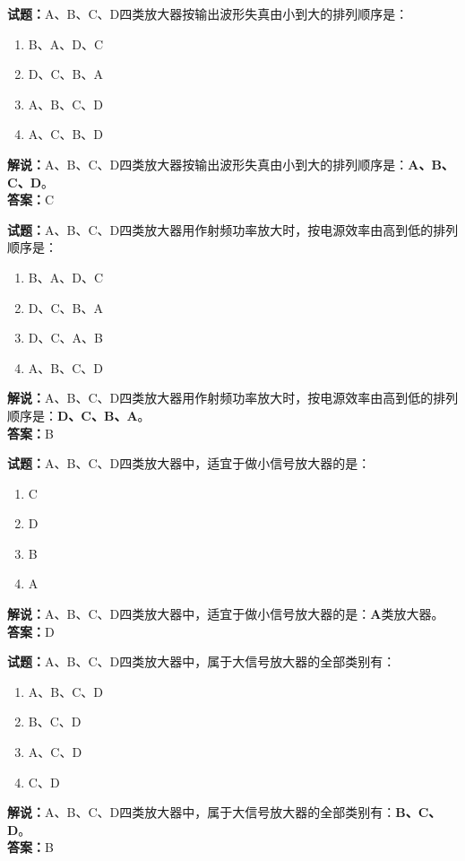 \documentclass{ctexbook}
\begin{document}
\vspace{1em}

\textbf{试题：}A、B、C、D四类放大器按输出波形失真由小到大的排列顺序是：
\begin{enumerate}[leftmargin=3em]
  \item B、A、D、C
  \item D、C、B、A
  \item A、B、C、D
  \item A、C、B、D
\end{enumerate}
\noindent\textbf{解说：}A、B、C、D四类放大器按输出波形失真由小到大的排列顺序是：\textbf{A、B、C、D}。\\\noindent\textbf{答案：}C

\vspace{1em}

\textbf{试题：}A、B、C、D四类放大器用作射频功率放大时，按电源效率由高到低的排列顺序是：
\begin{enumerate}[leftmargin=3em]
  \item B、A、D、C
  \item D、C、B、A
  \item D、C、A、B
  \item A、B、C、D
\end{enumerate}
\noindent\textbf{解说：}A、B、C、D四类放大器用作射频功率放大时，按电源效率由高到低的排列顺序是：\textbf{D、C、B、A}。\\\noindent\textbf{答案：}B

\vspace{1em}

\textbf{试题：}A、B、C、D四类放大器中，适宜于做小信号放大器的是：
\begin{enumerate}[leftmargin=3em]
  \item C
  \item D
  \item B
  \item A
\end{enumerate}
\noindent\textbf{解说：}A、B、C、D四类放大器中，适宜于做小信号放大器的是：\textbf{A}类放大器。\\\noindent\textbf{答案：}D

\vspace{1em}

\textbf{试题：}A、B、C、D四类放大器中，属于大信号放大器的全部类别有：
\begin{enumerate}[leftmargin=3em]
  \item A、B、C、D
  \item B、C、D
  \item A、C、D
  \item C、D
\end{enumerate}
\noindent\textbf{解说：}A、B、C、D四类放大器中，属于大信号放大器的全部类别有：\textbf{B、C、D}。\\\noindent\textbf{答案：}B
\end{document}
